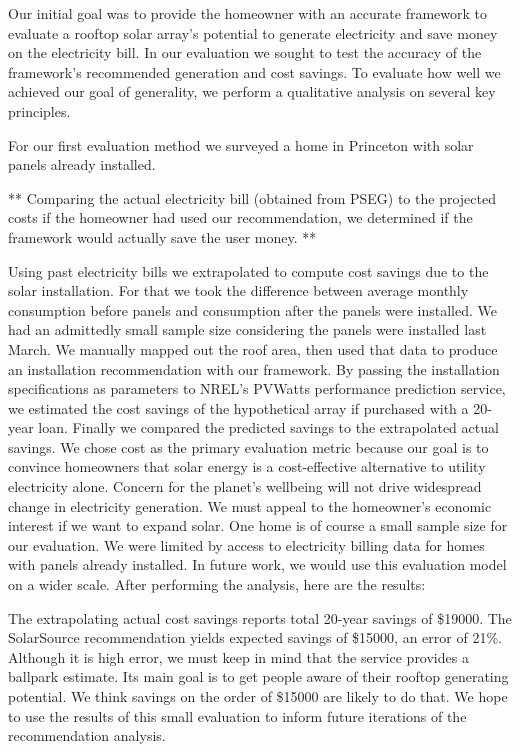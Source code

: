 \documentclass[pageno]{jpaper}
\begin{document}
Our initial goal was to provide the homeowner with an accurate framework to evaluate a rooftop solar array's potential to generate electricity and save money on the electricity bill. In our evaluation we sought to test the accuracy of the framework's recommended generation and cost savings. To evaluate how well we achieved our goal of generality, we perform a qualitative analysis on several key principles.

For our first evaluation method we surveyed a home in Princeton with solar panels already installed. 

**
Comparing the actual electricity bill (obtained from PSEG) to the projected costs if the homeowner had used our recommendation, we determined if the framework would actually save the user money. 
**

Using past electricity bills we extrapolated to compute cost savings due to the solar installation. For that we took the difference between average monthly consumption before panels and consumption after the panels were installed. We had an admittedly small sample size considering the panels were installed last March. We manually mapped out the roof area, then used that data to produce an installation recommendation with our framework. By passing the installation specifications as parameters to NREL's PVWatts performance prediction service, we estimated the cost savings of the hypothetical array if purchased with a 20-year loan. Finally we compared the predicted savings to the extrapolated actual savings. We chose cost as the primary evaluation metric because our goal is to convince homeowners that solar energy is a cost-effective alternative to utility electricity alone. Concern for the planet's wellbeing will not drive widespread change in electricity generation. We must appeal to the homeowner's economic interest if we want to expand solar. One home is of course a small sample size for our evaluation. We were limited by access to electricity billing data for homes with panels already installed. In future work, we would use this evaluation model on a wider scale. After performing the analysis, here are the results:

The extrapolating actual cost savings reports total 20-year savings of \$19000. The SolarSource recommendation yields expected savings of \$15000, an error of 21\%. Although it is high error, we must keep in mind that the service provides a ballpark estimate. Its main goal is to get people aware of their rooftop generating potential. We think savings on the order of \$15000 are likely to do that. We hope to use the results of this small evaluation to inform future iterations of the recommendation analysis.
\end{document}
